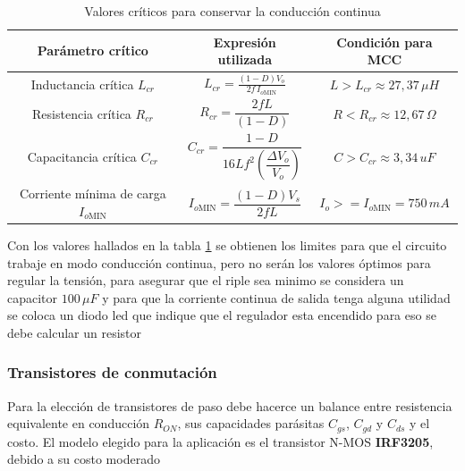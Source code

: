 \documentclass[]{article}
\begin{document}
	\renewcommand{\arraystretch}{1.5}
	\begin{table}[H]
		\centering
		\caption{Valores críticos para conservar la conducción continua}
		\renewcommand{\arraystretch}{1.5}
		\begin{tabular}{|c|c|c|}
			\hline
			\textbf{Parámetro crítico} & \textbf{Expresión utilizada} & \textbf{Condición para MCC} \\
			\hline
			
			Inductancia crítica \(L_{cr}\) &
			\(
			L_{cr}= \frac{(1-D)V_o}{2f\,I_{o\text{MIN}}}
			\)
			&
			\(
			L > L_{cr} \approx 27,37 \, \mu H
			\)
			\\
			
			\hline
			
			Resistencia crítica \(R_{cr}\) &
			\(
			R_{cr}=\dfrac{2fL}{(1-D)}
			\)
			&
			\(
			R < R_{cr} \approx 12,67\, \Omega
			\)
			\\
			
			\hline
			
			Capacitancia crítica \(C_{cr}\) &
			\(
			C_{cr}=\dfrac{1-D}{16Lf^2\left(\dfrac{\Delta V_o}{V_o}\right)}
			\)
			&
			\(
			C > C_{cr} \approx 3,34 \, uF
			\)
			\\
			
			\hline
			
			Corriente mínima de carga \(I_{o\text{MIN}}\) &
			\(
			I_{o\text{MIN}}=\dfrac{(1-D)V_s}{2fL}
			\)
			&
			\(
			I_o >= I_{o\text{MIN}} = 750 \, mA
			\)
			\\
			
			\hline
			
		\end{tabular}
		\label{tab:criticos_mcc}
	\end{table}
	
	
	Con los valores hallados en la tabla \ref{tab:criticos_mcc} se obtienen los limites para que el circuito trabaje en modo conducción continua, pero no serán los valores óptimos para regular la tensión, para asegurar que el riple sea minimo se considera un capacitor $100 \, \mu F$ y para que la corriente continua de salida tenga alguna utilidad se coloca un diodo led que indique que el regulador esta encendido para eso se debe calcular un resistor 
	
	\subsubsection{Transistores de conmutación}
	Para la elección de transistores de paso debe hacerce un balance entre resistencia equivalente en conducción $R_{ON}$, sus capacidades parásitas $C_{gs}$, $C_{gd}$ y $C_{ds}$ y el costo.
	El modelo elegido para la aplicación es el transistor N-MOS \textbf{IRF3205}, debido a su costo moderado
	
\end{document}
